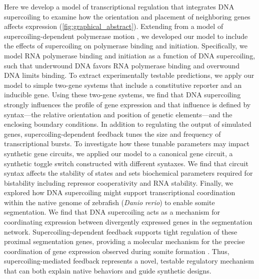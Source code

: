 \documentclass[11pt]{article}
\begin{document}
Here we develop a model of transcriptional regulation that integrates DNA supercoiling to examine how the orientation and placement of neighboring genes affects expression (\cref{fig:graphical_abstract}). Extending from a model of supercoiling-dependent polymerase motion \parencite{sevierPropertiesGeneExpression2018}, we developed our model to include the effects of supercoiling on polymerase binding and initiation. Specifically, we model RNA polymerase binding and initiation as a function of DNA supercoiling, such that underwound DNA favors RNA polymerase binding and overwound DNA limits binding. To extract experimentally testable predictions, we  apply our model to simple two-gene systems that include a constitutive reporter and an inducible gene. Using these two-gene systems, we find that DNA supercoiling strongly influences the profile of gene expression and that influence is defined by syntax---the relative orientation and position of genetic elements---and the enclosing boundary conditions. In addition to regulating the output of simulated genes, supercoiling-dependent feedback tunes the size and frequency of transcriptional bursts. To investigate how these tunable parameters may impact synthetic gene circuits, we applied our model to a canonical gene circuit, a synthetic toggle switch constructed with different syntaxes.
We find that circuit syntax affects the stability of states and sets biochemical parameters required for bistability including repressor cooperativity and RNA stability. Finally, we explored how DNA supercoiling might support transcriptional coordination within the native genome of zebrafish (\textit{Danio rerio}) to enable somite segmentation. We find that DNA supercoiling acts as a mechanism for coordinating expression between divergently expressed genes in the segmentation network. Supercoiling-dependent feedback supports tight regulation of these proximal segmentation genes, providing a molecular mechanism for the precise coordination of gene expression observed during somite formation \parencite{zinaniPairingSegmentationClock2021}. Thus, supercoiling-mediated feedback represents a novel, testable regulatory mechanism that can both explain native behaviors and guide synthetic designs.



\FloatBarrier
\end{document}
